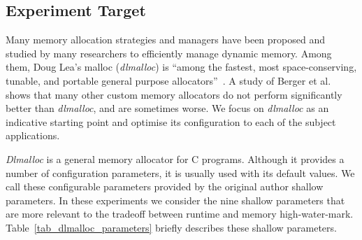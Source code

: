 \subsection{Experiment Target}



Many memory allocation strategies and managers have been proposed and studied by many researchers to efficiently manage dynamic memory. Among them, Doug Lea's malloc (\emph{dlmalloc}) is ``among the fastest, most space-conserving, tunable, and portable general purpose allocators''~\cite{lea1996memory}. A study of Berger et al.~\cite{Berger:2002:RCM:582419.582421} shows that many other custom memory allocators do not perform significantly better than \emph{dlmalloc}, and are sometimes worse. We focus on \emph{dlmalloc} as an indicative starting point and optimise its configuration to each of the subject applications.

\emph{Dlmalloc} is a general memory allocator for C
programs. Although it provides a number of configuration parameters,  
it is usually used with its default values. 
We call these configurable parameters provided by the original author
shallow parameters. In these experiments we consider the nine shallow
parameters that are more relevant to the tradeoff between runtime and
memory high-water-mark. Table~\ref{tab_dlmalloc_parameters} briefly
describes these shallow parameters. 

